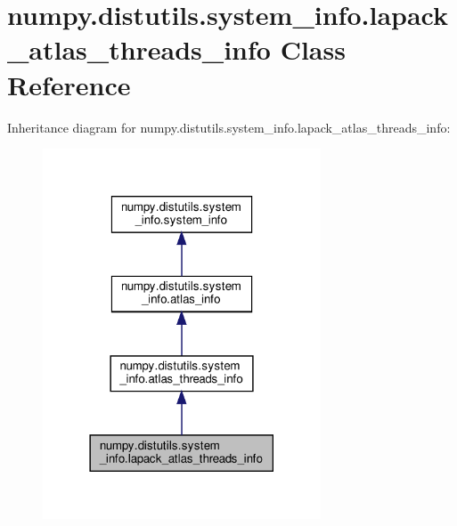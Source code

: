 \hypertarget{classnumpy_1_1distutils_1_1system__info_1_1lapack__atlas__threads__info}{}\section{numpy.\+distutils.\+system\+\_\+info.\+lapack\+\_\+atlas\+\_\+threads\+\_\+info Class Reference}
\label{classnumpy_1_1distutils_1_1system__info_1_1lapack__atlas__threads__info}


Inheritance diagram for numpy.\+distutils.\+system\+\_\+info.\+lapack\+\_\+atlas\+\_\+threads\+\_\+info\+:
\nopagebreak
\begin{figure}[H]
\begin{center}
\leavevmode
\includegraphics[width=234pt]{classnumpy_1_1distutils_1_1system__info_1_1lapack__atlas__threads__info__inherit__graph}
\end{center}
\end{figure}


